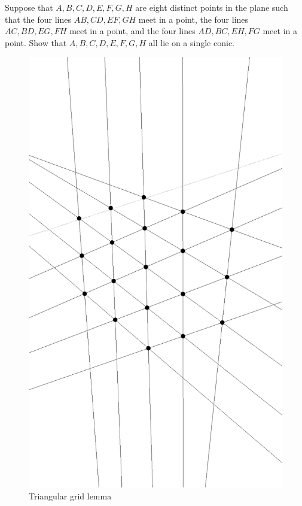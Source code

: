 \begin{exer}\label{fourpairs} Suppose that $A,B,C,D,E,F,G,H$ are eight distinct points in the plane such that the four lines $AB, CD, EF, GH$ meet in a point, the four lines $AC, BD, EG, FH$ meet in a point, and the four lines $AD, BC, EH, FG$ meet in a point. Show that $A,B,C,D,E,F,G,H$ all lie on a single conic.
\end{exer}

\begin{figure}[!htb]
\centering
\includegraphics[scale=0.5,angle=270]{triangulargrid.eps}
\caption{Triangular grid lemma}
\end{figure}


